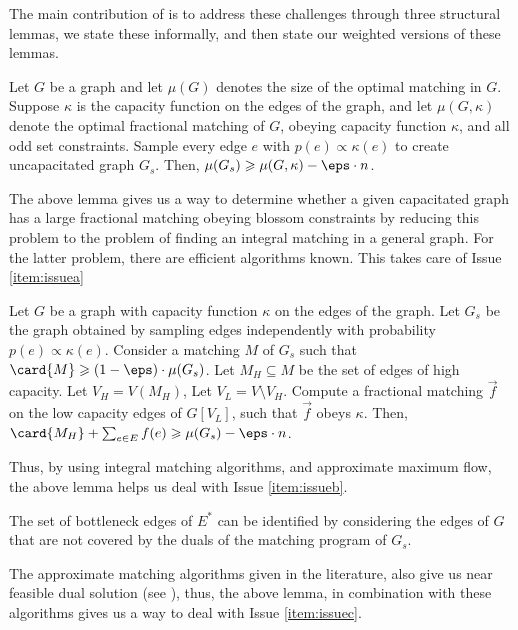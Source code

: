 The main contribution of \cite{AssadiBD22} is to address these challenges through three structural lemmas, we state these informally, and then state our weighted versions of these lemmas.

\begin{lemma2}\label{lem:detect}
Let $G$ be a graph and let $\mu(G)$ denotes the size of the optimal matching in $G$. Suppose $\kappa$ is the capacity function on the edges of the graph, and let $\mu(G,\kappa)$ denote the optimal fractional matching of $G$, obeying capacity function $\kappa$, and all odd set constraints. Sample every edge $e$ with $p(e) \propto \kappa(e)$ to create uncapacitated graph $G_s$. Then, $\mu(G_s)\geqslant \mu(G,\kappa)-\eps\cdot n$.
\end{lemma2}

The above lemma gives us a way to determine whether a given capacitated graph has a large fractional matching obeying blossom constraints by reducing this problem to the problem of finding an integral matching in a general graph. For the latter problem, there are efficient algorithms known. This takes care of Issue \ref{item:issuea}

\begin{lemma2}\label{lem:find}
Let $G$ be a graph with capacity function $\kappa$ on the edges of the graph. Let $G_s$ be the graph obtained by sampling edges independently with probability $p(e)\propto \kappa (e)$. Consider a matching $M$ of $G_s$ such that $\card{M}\geqslant (1-\eps)\cdot \mu(G_s)$. Let $M_H\subseteq M$ be the set of edges of high capacity. Let $V_H=V(M_H)$, Let $V_L=V\setminus V_H$. Compute a fractional matching $\vec{f}$ on the low capacity edges of $G[V_L]$, such that $\vec{f}$ obeys $\kappa$. Then, $\card{M_H}+\sum_{e\in E}f(e)\geqslant \mu(G_s)-\eps\cdot n$.
\end{lemma2}

Thus, by using integral matching algorithms, and approximate maximum flow, the above lemma helps us deal with Issue \ref{item:issueb}.

\begin{lemma2}\label{lem:increase}
The set of bottleneck edges of $E^*$ can be identified by considering the edges of $G$ that are not covered by the duals of the matching program of $G_s$. 
\end{lemma2}

The approximate matching algorithms given in the literature, also give us near feasible dual solution (see \cite{DP09}), thus, the above lemma, in combination with these algorithms gives us a way to deal with Issue \ref{item:issuec}. 


